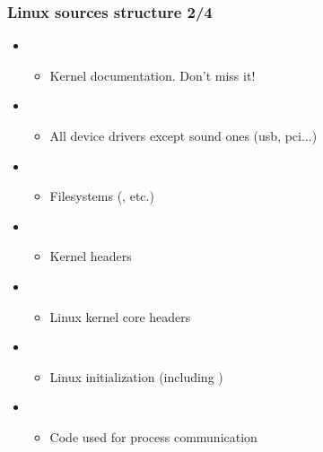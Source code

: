 \begin{frame}
  \frametitle{Linux sources structure 2/4}
  \begin{itemize}  
  \item {}
    \begin{itemize}
    \item Kernel documentation. Don't miss it!
    \end{itemize}
  \item {}
    \begin{itemize}
    \item All device drivers except sound ones (usb, pci...)
    \end{itemize}
  \item {}
    \begin{itemize}
    \item Filesystems (, etc.)
    \end{itemize}
  \item {}
    \begin{itemize}
    \item Kernel headers
    \end{itemize}
  \item {}
    \begin{itemize}
    \item Linux kernel core headers
    \end{itemize}
  \item {}
    \begin{itemize}
    \item Linux initialization (including )
    \end{itemize}
  \item {}
    \begin{itemize}
    \item Code used for process communication
    \end{itemize}
  \end{itemize}
\end{frame}


